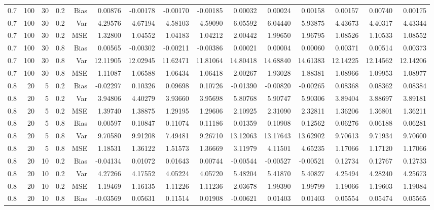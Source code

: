 \begin{table}[!htbp]
\begin{tabular}{lrrrrrrrrrrrrrr}
0.7 & 100 & 30 & 0.2 & Bias & 0.00876 & -0.00178 & -0.00170 & -0.00185 & 0.00032 & 0.00024 & 0.00158 & 0.00157 & 0.00740 & 0.00175 \\
0.7 & 100 & 30 & 0.2 & Var & 4.29576 & 4.67194 & 4.58103 & 4.59090 & 6.05592 & 6.04440 & 5.93875 & 4.43673 & 4.40317 & 4.43344 \\
0.7 & 100 & 30 & 0.2 & MSE & 1.32800 & 1.04552 & 1.04183 & 1.04212 & 2.00442 & 1.99650 & 1.96795 & 1.08526 & 1.10533 & 1.08552 \\
0.7 & 100 & 30 & 0.8 & Bias & 0.00565 & -0.00302 & -0.00211 & -0.00386 & 0.00021 & 0.00004 & 0.00060 & 0.00371 & 0.00514 & 0.00373 \\
0.7 & 100 & 30 & 0.8 & Var & 12.11905 & 12.02945 & 11.62471 & 11.81064 & 14.80418 & 14.68840 & 14.61383 & 12.14225 & 12.14562 & 12.14206 \\
0.7 & 100 & 30 & 0.8 & MSE & 1.11087 & 1.06588 & 1.06434 & 1.06418 & 2.00267 & 1.93028 & 1.88381 & 1.08966 & 1.09953 & 1.08977 \\
0.8 &  20 &  5 & 0.2 & Bias & -0.02297 & 0.10326 & 0.09698 & 0.10726 & -0.01390 & -0.00820 & -0.00265 & 0.08368 & 0.08362 & 0.08384 \\
0.8 &  20 &  5 & 0.2 & Var & 3.94806 & 4.40279 & 3.93660 & 3.95698 & 5.80768 & 5.90747 & 5.90306 & 3.89404 & 3.88697 & 3.89181 \\
0.8 &  20 &  5 & 0.2 & MSE & 1.39740 & 1.38875 & 1.29195 & 1.29606 & 2.10925 & 2.31090 & 2.32811 & 1.36206 & 1.36801 & 1.36211 \\
0.8 &  20 &  5 & 0.8 & Bias & 0.00597 & 0.10847 & 0.11074 & 0.11186 & 0.01359 & 0.10908 & 0.12562 & 0.06276 & 0.06188 & 0.06281 \\
0.8 &  20 &  5 & 0.8 & Var & 9.70580 & 9.91208 & 7.49481 & 9.26710 & 13.12063 & 13.17643 & 13.62902 & 9.70613 & 9.71934 & 9.70600 \\
0.8 &  20 &  5 & 0.8 & MSE & 1.18531 & 1.36122 & 1.51573 & 1.36669 & 3.11979 & 4.11501 & 4.65235 & 1.17066 & 1.17120 & 1.17066 \\
0.8 &  20 & 10 & 0.2 & Bias & -0.04134 & 0.01072 & 0.01643 & 0.00744 & -0.00544 & -0.00527 & -0.00521 & 0.12734 & 0.12767 & 0.12733 \\
0.8 &  20 & 10 & 0.2 & Var & 4.27266 & 4.17552 & 4.05224 & 4.05720 & 5.48204 & 5.41870 & 5.40827 & 4.25494 & 4.28240 & 4.25673 \\
0.8 &  20 & 10 & 0.2 & MSE & 1.19469 & 1.16135 & 1.11226 & 1.11236 & 2.03678 & 1.99390 & 1.99799 & 1.19066 & 1.19603 & 1.19084 \\
0.8 &  20 & 10 & 0.8 & Bias & -0.03569 & 0.05631 & 0.11514 & 0.01908 & -0.00621 & 0.01403 & 0.01403 & 0.05554 & 0.05474 & 0.05565 \\

\end{tabular}
\end{table}
